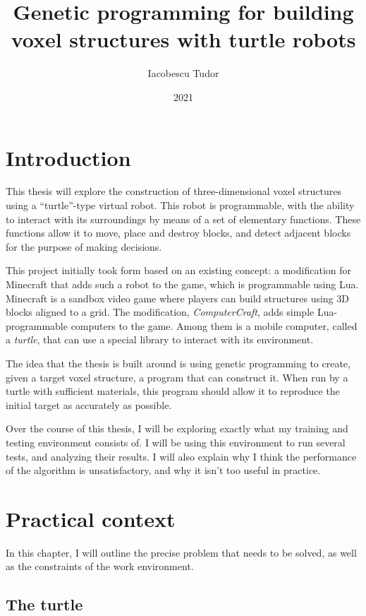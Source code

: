 \documentclass{report}
\title{Genetic programming for building voxel structures with turtle robots}
\author{Iacobescu Tudor}
\date{2021}
\begin{document}

\maketitle

\tableofcontents

\chapter{Introduction}
This thesis will explore the construction of three-dimensional voxel structures using a “turtle”-type virtual robot. This robot is programmable, with the ability to interact with its surroundings by means of a set of elementary functions. These functions allow it to move, place and destroy blocks, and detect adjacent blocks for the purpose of making decisions.

This project initially took form based on an existing concept: a modification for Minecraft that adds such a robot to the game, which is programmable using Lua. Minecraft is a sandbox video game where players can build structures using 3D blocks aligned to a grid. The modification, \emph{ComputerCraft}\cite{ccwiki}, adds simple Lua-programmable computers to the game. Among them is a mobile computer, called a \emph{turtle}, that can use a special library to interact with its environment.

The idea that the thesis is built around is using genetic programming to create, given a target voxel structure, a program that can construct it. When run by a turtle with sufficient materials, this program should allow it to reproduce the initial target as accurately as possible.

Over the course of this thesis, I will be exploring exactly what my training and testing environment consists of. I will be using this environment to run several tests, and analyzing their results. I will  also explain why I think the performance of the algorithm is unsatisfactory, and why it isn't too useful in practice.

\chapter{Practical context}
In this chapter, I will outline the precise problem that needs to be solved, as well as the constraints of the work environment.

\section{The turtle}
\label{sec:turtle}
\end{document}
